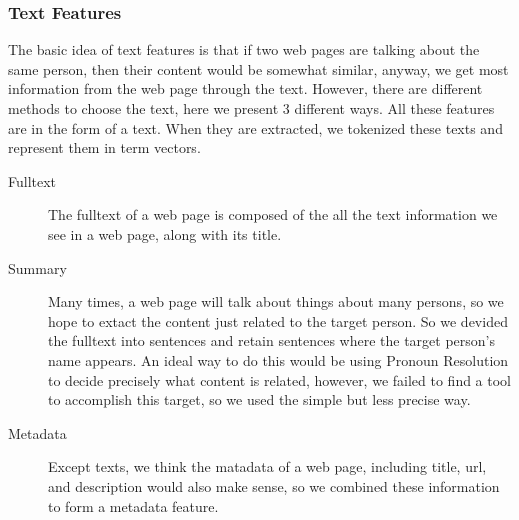 \documentclass{article}
\begin{document}
\begin{CJK}{UTF8}{gbsn}
        \subsubsection{Text Features}
            The basic idea of text features is that if two web pages are talking about the same person, then their content would be somewhat similar, anyway, we get most information from the web page through the text. However, there are different methods to choose the text, here we present 3 different ways. All these features are in the form of a text. When they are extracted, we tokenized these texts and represent them in term vectors.
            \begin{description}
            \item [Fulltext] The fulltext of a web page is composed of the all the text information we see in a web page, along with its title.
            \item [Summary] Many times, a web page will talk about things about many persons, so we hope to extact the content just related to the target person. So we devided the fulltext into sentences and retain sentences where the target person's name appears. An ideal way to do this would be using Pronoun Resolution to decide precisely what content is related, however, we failed to find a tool to accomplish this target, so we used the simple but less precise way. 
            \item [Metadata] Except texts, we think the matadata of a web page, including title, url, and description would also make sense, so we combined these information to form a metadata feature.
            \end{description}


\end{CJK}
\end{document}
